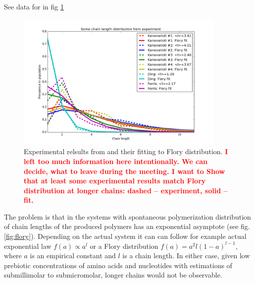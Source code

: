 \documentclass[12pt]{paper}
\newcommand{\red}[1]{\textcolor{red}{#1}}
\begin{document}
See data for \cite{Kanavarioti2001} in fig \ref{fig:some_flory}
\begin{figure}[h!]
  \centering
  \includegraphics[width=0.9\textwidth]{pictures/some_flory.png} 
  \caption{Experimental relsults from \cite{Kanavarioti2001} and their fitting to Flory 
distribution. \red{\textbf{I left too much information here intentionally. We can decide, 
what to leave during the meeting. I want to Show that at least some experimental results match 
Flory distribution at longer chains: dashed -- experiment, solid -- fit.}}}
  \label{fig:some_flory}
\end{figure}


The problem is that in the systems with spontaneous polymerization distribution of chain lengths 
of the produced polymers has an exponential asymptote  (see fig. \ref{fig:flory}). Depending on the 
actual system it can can follow for example actual exponential 
law  $f(a)\propto a^l$\cite{nowak2008prevolutionary,Derr2012} or a Flory distribution 
$f(a)=a^2l(1-a)^{l-1}$\cite{Flory1953}, where $a$ is an empirical constant and $l$ is a chain 
length. 
In either case, given low prebiotic concentrations of amino acids and nucleotides with estimations 
of submillimolar to submicromolar\cite{Aubrey2009,Kanavarioti2001,Lazcano1996}, longer chains 
would not be observable.
\end{document}
